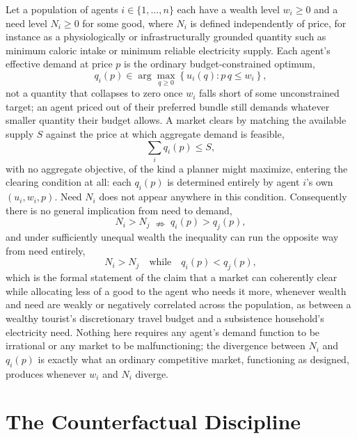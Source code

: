 \documentclass[11pt]{article}
\begin{document}
Let a population of agents $i \in \{1, \dots, n\}$ each have a wealth level $w_i \geq 0$ and a need level $N_i \geq 0$ for some good, where $N_i$ is defined independently of price, for instance as a physiologically or infrastructurally grounded quantity such as minimum caloric intake or minimum reliable electricity supply. Each agent's effective demand at price $p$ is the ordinary budget-constrained optimum,
\[
q_i(p) \in \arg\max_{q \geq 0} \left\{ u_i(q) : p \, q \leq w_i \right\},
\]
not a quantity that collapses to zero once $w_i$ falls short of some unconstrained target; an agent priced out of their preferred bundle still demands whatever smaller quantity their budget allows. A market clears by matching the available supply $S$ against the price at which aggregate demand is feasible,
\[
\sum_i q_i(p) \leq S,
\]
with no aggregate objective, of the kind a planner might maximize, entering the clearing condition at all: each $q_i(p)$ is determined entirely by agent $i$'s own $(u_i, w_i, p)$. Need $N_i$ does not appear anywhere in this condition. Consequently there is no general implication from need to demand,
\[
N_i > N_j \;\nRightarrow\; q_i(p) > q_j(p),
\]
and under sufficiently unequal wealth the inequality can run the opposite way from need entirely,
\[
N_i > N_j \quad \text{while} \quad q_i(p) < q_j(p),
\]
which is the formal statement of the claim that a market can coherently clear while allocating less of a good to the agent who needs it more, whenever wealth and need are weakly or negatively correlated across the population, as between a wealthy tourist's discretionary travel budget and a subsistence household's electricity need. Nothing here requires any agent's demand function to be irrational or any market to be malfunctioning; the divergence between $N_i$ and $q_i(p)$ is exactly what an ordinary competitive market, functioning as designed, produces whenever $w_i$ and $N_i$ diverge.

\section{The Counterfactual Discipline}
\end{document}
